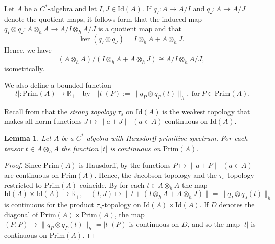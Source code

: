 \documentclass[]{amsart}
\newtheorem{lemma}[theorem]{Lemma}
\theoremstyle{remark}
\theoremstyle{definition}
\theoremstyle{question}
\numberwithin{equation}{section}
\begin{document}
 Let $A$ be a $C^*$-algebra and let $I,J \in \mathrm{Id}(A)$. If $q_I : A \to
A/I$ and $q_J : A \to A/J$ denote the quotient maps, it follows
 form \cite[2.8]{ASS} that the induced map
   $q_I \otimes q_J : A \otimes_h A \to A/I \otimes_h A/J$ is a quotient map and
that $$\ker(q_I \otimes q_J)=I \otimes_h A + A \otimes_h J.$$
Hence, we have
$$(A \otimes_h A)/(I \otimes_h A + A \otimes_h J) \cong A/I \otimes_h A/J,$$
isometrically.

We also define a
bounded function
 $$|t| : \mathrm{Prim}(A) \to {\mathbb{R}}_+ \quad \mathrm{by} \quad |t|(P):=\|q_P \otimes
q_P(t)\|_h, \ \mathrm{for} \ P \in \mathrm{Prim}(A).$$

Recall from \cite{Arc2} that the \textit{strong topology} $\tau_s$ on $\mathrm{Id}(A)$ is the weakest topology that makes all norm functions $J \mapsto \|a+J\|$ $(a \in A)$ continuous on $\mathrm{Id}(A)$.

\begin{lemma}\label{tens} Let $A$ be a $C^*$-algebra with  Hausdorff
primitive spectrum. For each tensor $t \in A \otimes_h A$ the function $|t|$ is continuous on $\mathrm{Prim}(A)$.
\end{lemma}
\begin{proof} Since $\mathrm{Prim}(A)$ is Hausdorff, by \cite[4.4.5]{Ped} the functions $P \mapsto
\|a+P\|$ $(a \in A)$ are continuous on $\mathrm{Prim}(A)$.
Hence, the Jacobson topology and the $\tau_s$-topology restricted to
$\mathrm{Prim}(A)$ coincide. By \cite[Prop. 2]{Som2} for each $t \in A \otimes_h A$
the map
$$\mathrm{Id}(A) \times \mathrm{Id}(A) \to {\mathbb{R}}_+, \quad (I,J) \mapsto \|t + (I
\otimes_h A + A \otimes_h J)\|=\|q_I \otimes q_J(t)\|_h$$
is continuous for the product $\tau_s$-topology on $\mathrm{Id}(A) \times
\mathrm{Id}(A)$.
If $D$ denotes the diagonal of $\mathrm{Prim}(A)\times \mathrm{Prim}(A)$, the map $(P ,P)\mapsto\|q_P \otimes q_P(t)\|_h=|t|(P)$ is
continuous on $D$, and so the map $|t|$ is continuous on  $\mathrm{Prim}(A)$.
\end{proof}
\end{document}
